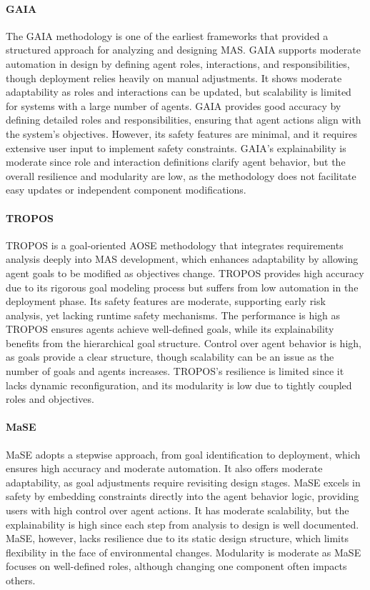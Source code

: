 \documentclass[sigconf,anonymous]{aamas}
\begin{document}
\paragraph{GAIA}
The GAIA methodology \cite{wooldridge1999method} is one of the earliest frameworks that provided a structured approach for analyzing and designing MAS. GAIA supports moderate automation in design by defining agent roles, interactions, and responsibilities, though deployment relies heavily on manual adjustments. It shows moderate adaptability as roles and interactions can be updated, but scalability is limited for systems with a large number of agents. GAIA provides good accuracy by defining detailed roles and responsibilities, ensuring that agent actions align with the system's objectives. However, its safety features are minimal, and it requires extensive user input to implement safety constraints. GAIA's explainability is moderate since role and interaction definitions clarify agent behavior, but the overall resilience and modularity are low, as the methodology does not facilitate easy updates or independent component modifications.

\paragraph{TROPOS}
TROPOS \cite{bresciani2004tropos} is a goal-oriented AOSE methodology that integrates requirements analysis deeply into MAS development, which enhances adaptability by allowing agent goals to be modified as objectives change. TROPOS provides high accuracy due to its rigorous goal modeling process but suffers from low automation in the deployment phase. Its safety features are moderate, supporting early risk analysis, yet lacking runtime safety mechanisms. The performance is high as TROPOS ensures agents achieve well-defined goals, while its explainability benefits from the hierarchical goal structure. Control over agent behavior is high, as goals provide a clear structure, though scalability can be an issue as the number of goals and agents increases. TROPOS's resilience is limited since it lacks dynamic reconfiguration, and its modularity is low due to tightly coupled roles and objectives.

\paragraph{MaSE}
MaSE \cite{de1999multi} adopts a stepwise approach, from goal identification to deployment, which ensures high accuracy and moderate automation. It also offers moderate adaptability, as goal adjustments require revisiting design stages. MaSE excels in safety by embedding constraints directly into the agent behavior logic, providing users with high control over agent actions. It has moderate scalability, but the explainability is high since each step from analysis to design is well documented. MaSE, however, lacks resilience due to its static design structure, which limits flexibility in the face of environmental changes. Modularity is moderate as MaSE focuses on well-defined roles, although changing one component often impacts others.
\end{document}
